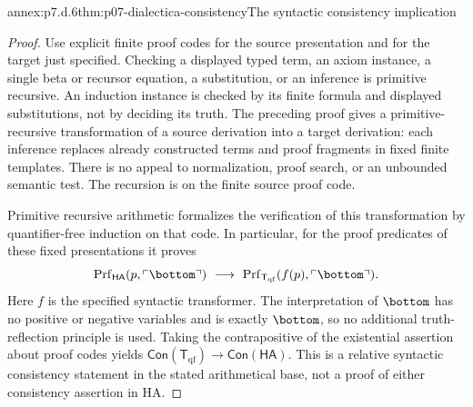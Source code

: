 \begin{annexitem}{annex:p7.d.6}{thm:p07-dialectica-consistency}{The syntactic consistency implication}
\begin{proof}
Use explicit finite proof codes for the source presentation and for the
target just specified. Checking a displayed typed term, an axiom
instance, a single beta or recursor equation, a substitution, or an
inference is primitive recursive. An induction instance is checked by
its finite formula and displayed substitutions, not by deciding its
truth. The preceding proof gives a primitive-recursive transformation
of a source derivation into a target derivation: each inference replaces
already constructed terms and proof fragments in fixed finite templates.
There is no appeal to normalization, proof search, or an unbounded
semantic test. The recursion is on the finite source proof code.

Primitive recursive arithmetic formalizes the verification of this
transformation by quantifier-free induction on that code. In particular,
for the proof predicates of these fixed presentations it proves
\[
 \operatorname{Prf}_{\mathsf{HA}}(p,\ulcorner\bottom\urcorner)
 \ \longrightarrow\
 \operatorname{Prf}_{\mathsf T_{\mathrm{qf}}}
       (f(p),\ulcorner\bottom\urcorner).
\]
Here \(f\) is the specified syntactic transformer. The interpretation
of \(\bottom\) has no positive or negative variables and is exactly
\(\bottom\), so no additional truth-reflection principle is used.
Taking the contrapositive of the existential assertion about proof
codes yields
\(\mathsf{Con}(\mathsf T_{\mathrm{qf}})\to
\mathsf{Con}(\mathsf{HA})\).
This is a relative syntactic consistency statement in the stated
arithmetical base, not a proof of either consistency assertion in HA.
\end{proof}
\end{annexitem}
